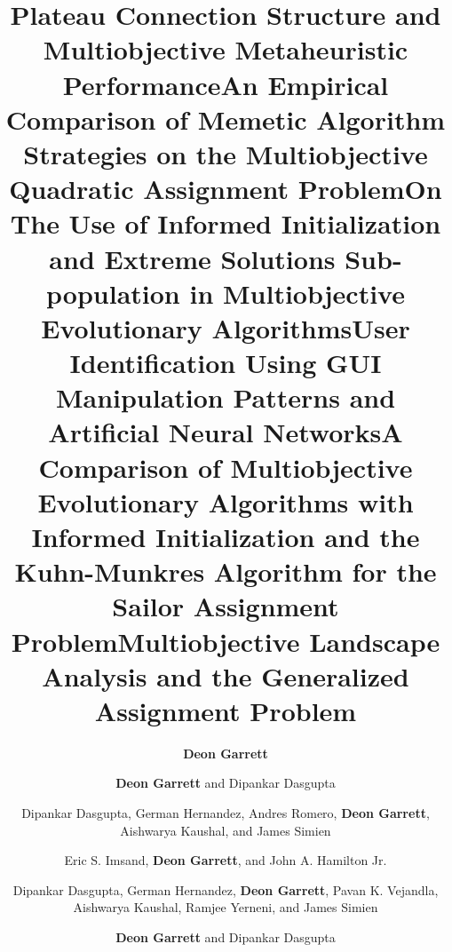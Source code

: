\documentclass[a4paper,10pt]{cvclean}
\begin{document}
\begin{publications}
\begin{conferencepapers}
    \begin{paper}
      \title{Plateau Connection Structure and Multiobjective Metaheuristic
        Performance}
      \author{\textbf{Deon Garrett}}
    \end{paper}
    \begin{paper}
      \title{An Empirical Comparison of Memetic Algorithm Strategies on the
        Multiobjective Quadratic Assignment Problem}
      \author{\textbf{Deon Garrett} and Dipankar Dasgupta}
    \end{paper}
    \begin{paper}
      \title{On The Use of Informed Initialization and Extreme Solutions
        Sub-population in Multiobjective Evolutionary Algorithms}
      \author{Dipankar Dasgupta, German Hernandez, Andres Romero, \textbf{Deon Garrett},
        Aishwarya Kaushal, and James Simien}
    \end{paper}
    \begin{paper}
      \title{User Identification Using GUI Manipulation Patterns and Artificial
        Neural Networks}
      \author{Eric S. Imsand, \textbf{Deon Garrett}, and John A. Hamilton Jr.}
    \end{paper}
    \begin{paper}
      \title{A Comparison of Multiobjective Evolutionary Algorithms with
        Informed Initialization and the Kuhn-Munkres Algorithm for the Sailor
        Assignment Problem} 
      \author{Dipankar Dasgupta, German Hernandez, \textbf{Deon Garrett}, Pavan
        K. Vejandla, Aishwarya Kaushal, Ramjee Yerneni, and James Simien}
    \end{paper}
    \begin{paper}
      \title{Multiobjective Landscape Analysis and the Generalized Assignment
        Problem}
      \author{\textbf{Deon Garrett} and Dipankar Dasgupta}

\end{paper}
\end{conferencepapers}
\end{publications}
\end{document}
